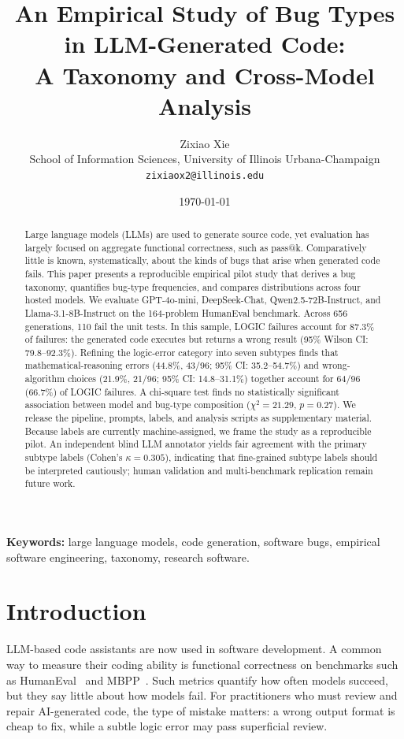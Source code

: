 \documentclass[10pt,journal]{article}
\title{An Empirical Study of Bug Types in LLM-Generated Code:\\
A Taxonomy and Cross-Model Analysis}
\author{Zixiao Xie\\
School of Information Sciences, University of Illinois Urbana-Champaign\\
\texttt{zixiaox2@illinois.edu}}
\date{\today}
\begin{document}
\maketitle

\begin{abstract}
Large language models (LLMs) are used to generate source code, yet
evaluation has largely focused on aggregate functional correctness, such as pass@k.
Comparatively little is known, systematically, about the kinds of bugs that arise
when generated code fails. This paper presents a reproducible empirical pilot study
that derives a bug taxonomy, quantifies bug-type frequencies, and compares
distributions across four hosted models. We evaluate GPT-4o-mini, DeepSeek-Chat,
Qwen2.5-72B-Instruct, and Llama-3.1-8B-Instruct on the 164-problem HumanEval
benchmark. Across 656 generations, 110 fail the unit tests. In this sample,
LOGIC failures account for 87.3\% of failures: the generated code executes but
returns a wrong result (95\% Wilson CI: 79.8--92.3\%). Refining the logic-error
category into seven subtypes finds that mathematical-reasoning errors (44.8\%,
43/96; 95\% CI: 35.2--54.7\%) and wrong-algorithm choices (21.9\%, 21/96;
95\% CI: 14.8--31.1\%) together account for 64/96 (66.7\%) of LOGIC failures.
A chi-square test finds no
statistically significant association between model and bug-type composition
($\chi^2=21.29$, $p=0.27$). We release the pipeline, prompts, labels, and analysis scripts as
supplementary material. Because labels are currently machine-assigned, we frame the
study as a reproducible pilot. An independent blind LLM annotator yields fair
agreement with the primary subtype labels (Cohen's $\kappa=0.305$), indicating that
fine-grained subtype labels should be interpreted cautiously; human
validation and multi-benchmark replication remain future work.
\end{abstract}

\textbf{Keywords:} large language models, code generation, software bugs,
empirical software engineering, taxonomy, research software.

\section{Introduction}
LLM-based code assistants are now used in software development. A common way to
measure their coding ability is functional correctness on
benchmarks such as HumanEval~\cite{chen2021codex} and MBPP~\cite{austin2021mbpp}.
Such metrics quantify how often models succeed, but they say little about how
models fail. For practitioners who must review and repair AI-generated code, the
type of mistake matters: a wrong output format is cheap to fix, while a subtle
logic error may pass superficial review.
\end{document}
